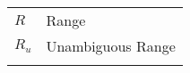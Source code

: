 \begin{longtable}{ p{}  p{} } 
$R$ & Range \\
$R_u$ & Unambiguous Range \\
\addlinespace[15pt]
\end{longtable}
